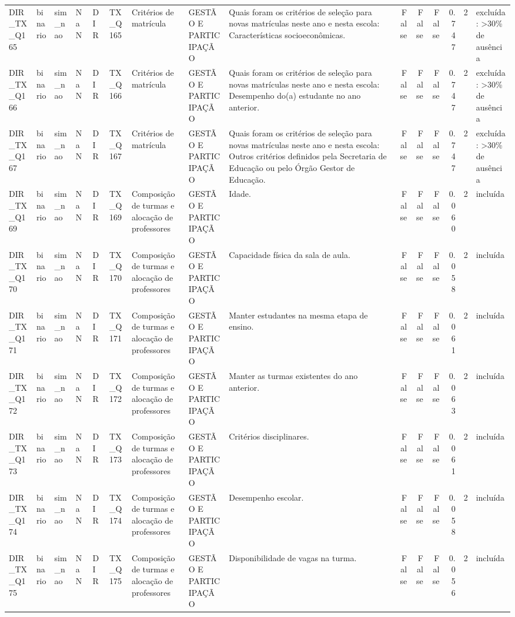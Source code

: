 \begin{tabular}{lllllllllrrrrrl}
DIR\_TX\_Q165 & binario & sim\_nao & NaN & DIR & TX\_Q165 & Critérios de matrícula & GESTÃO E PARTICIPAÇÃO & Quais foram os critérios de seleção para novas matrículas neste ano e nesta escola: Características socioeconômicas. & False & False & False & 0.747 & 2 & excluída: >30\% de ausência \\
DIR\_TX\_Q166 & binario & sim\_nao & NaN & DIR & TX\_Q166 & Critérios de matrícula & GESTÃO E PARTICIPAÇÃO & Quais foram os critérios de seleção para novas matrículas neste ano e nesta escola: Desempenho do(a) estudante no ano anterior. & False & False & False & 0.747 & 2 & excluída: >30\% de ausência \\
DIR\_TX\_Q167 & binario & sim\_nao & NaN & DIR & TX\_Q167 & Critérios de matrícula & GESTÃO E PARTICIPAÇÃO & Quais foram os critérios de seleção para novas matrículas neste ano e nesta escola: Outros critérios definidos pela Secretaria de Educação ou pelo Órgão Gestor de Educação. & False & False & False & 0.747 & 2 & excluída: >30\% de ausência \\
DIR\_TX\_Q169 & binario & sim\_nao & NaN & DIR & TX\_Q169 & Composição de turmas e alocação de professores & GESTÃO E PARTICIPAÇÃO & Idade. & False & False & False & 0.060 & 2 & incluída \\
DIR\_TX\_Q170 & binario & sim\_nao & NaN & DIR & TX\_Q170 & Composição de turmas e alocação de professores & GESTÃO E PARTICIPAÇÃO & Capacidade física da sala de aula. & False & False & False & 0.058 & 2 & incluída \\
DIR\_TX\_Q171 & binario & sim\_nao & NaN & DIR & TX\_Q171 & Composição de turmas e alocação de professores & GESTÃO E PARTICIPAÇÃO & Manter estudantes na mesma etapa de ensino. & False & False & False & 0.061 & 2 & incluída \\
DIR\_TX\_Q172 & binario & sim\_nao & NaN & DIR & TX\_Q172 & Composição de turmas e alocação de professores & GESTÃO E PARTICIPAÇÃO & Manter as turmas existentes do ano anterior. & False & False & False & 0.063 & 2 & incluída \\
DIR\_TX\_Q173 & binario & sim\_nao & NaN & DIR & TX\_Q173 & Composição de turmas e alocação de professores & GESTÃO E PARTICIPAÇÃO & Critérios disciplinares. & False & False & False & 0.061 & 2 & incluída \\
DIR\_TX\_Q174 & binario & sim\_nao & NaN & DIR & TX\_Q174 & Composição de turmas e alocação de professores & GESTÃO E PARTICIPAÇÃO & Desempenho escolar. & False & False & False & 0.058 & 2 & incluída \\
DIR\_TX\_Q175 & binario & sim\_nao & NaN & DIR & TX\_Q175 & Composição de turmas e alocação de professores & GESTÃO E PARTICIPAÇÃO & Disponibilidade de vagas na turma. & False & False & False & 0.056 & 2 & incluída \\

\end{tabular}
